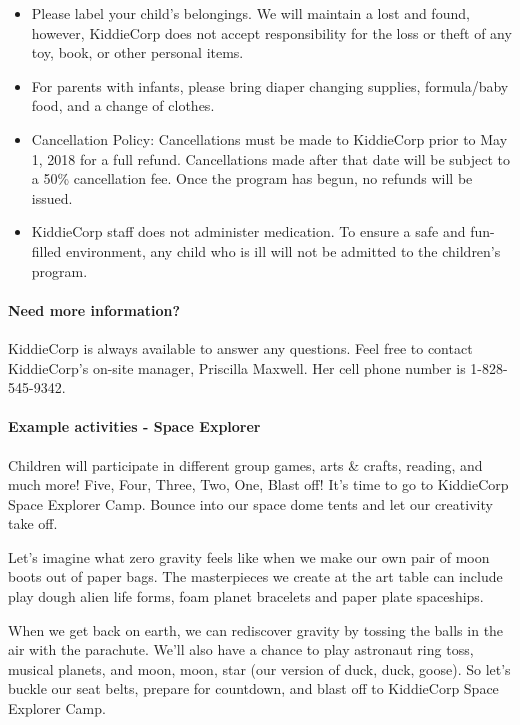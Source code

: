 \begin{itemize}
\item Please label your child's belongings. We will maintain a lost and found,
however, KiddieCorp does not accept responsibility for the loss or theft of
any toy, book, or other personal items.
\item For parents with infants, please bring diaper changing supplies,
formula/baby food, and a change of clothes.
\item Cancellation Policy: Cancellations must be made to KiddieCorp prior to
May 1, 2018 for a full refund. Cancellations made after that date will be
subject to a 50\% cancellation fee. Once the program has begun, no refunds
will be issued.
\item KiddieCorp staff does not administer medication. To ensure a safe and
fun-filled environment, any child who is ill will not be admitted to the
children's program.
\end{itemize}


\paragraph{Need more information?} KiddieCorp is always available to answer any questions. Feel free to
contact KiddieCorp's on-site manager, Priscilla Maxwell.  Her cell phone number is 1-828-545-9342.


\paragraph{Example activities - Space Explorer}

Children will participate in different group games, arts \& crafts, reading,
and much more! 
Five, Four, Three, Two, One, Blast off!  It’s time to go to KiddieCorp
Space Explorer Camp.  
Bounce into our space dome tents and let our creativity take off.



Let’s imagine what zero gravity feels like when we make our own
pair of moon boots out of paper bags.  The masterpieces we create 
at the art table can include play dough alien life forms, foam planet 
bracelets and paper plate spaceships.

When we get back on earth, we can rediscover gravity by tossing
the balls in the air with the parachute. We’ll also have a chance to 
play astronaut ring toss, musical planets, and moon, moon, star 
(our version of duck, duck, goose).  So let’s buckle our seat belts, 
prepare for countdown, and blast off to KiddieCorp Space Explorer Camp.
